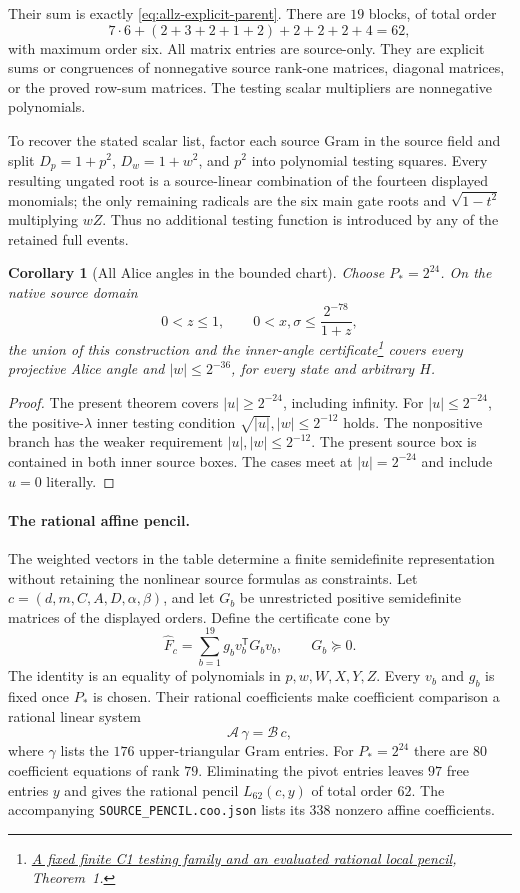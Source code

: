 \documentclass[11pt]{article}
\newtheorem{corollary}{Corollary}
\begin{document}
Their sum is exactly \eqref{eq:allz-explicit-parent}. There are
$19$ blocks, of total order
\[
 7\cdot6+(2+3+2+1+2)+2+2+2+4=62,
\]
with maximum order six. All matrix entries are source-only. They
are explicit sums or congruences of nonnegative source rank-one
matrices, diagonal matrices, or the proved row-sum matrices.
The testing scalar multipliers are nonnegative polynomials.

To recover the stated scalar list, factor each source Gram in the
source field and split $D_p=1+p^2$, $D_w=1+w^2$, and $p^2$ into
polynomial testing squares. Every resulting ungated root is a
source-linear combination of the fourteen displayed monomials;
the only remaining radicals are the six main gate roots and
$\sqrt{1-t^2}$ multiplying $wZ$. Thus no additional testing function
is introduced by any of the retained full events.



\begin{corollary}[All Alice angles in the bounded chart]\label{cor:alice}
Choose $P_*=2^{24}$. On the native source domain
\[
 0<z\le1,\qquad 0<x,\sigma\le\frac{2^{-78}}{1+z},
\]
the union of this construction and the inner-angle certificate\footnote{\href{https://github.com/anubhav70747/q222-finite-sdp/tree/main/extracted-lifts/local-order669}{A fixed finite C1 testing family and an evaluated rational local pencil}, Theorem~1.} covers every projective Alice angle and
$|w|\le2^{-36}$, for every state and arbitrary $H$.
\end{corollary}
\begin{proof}
The present theorem covers $|u|\ge2^{-24}$, including infinity.
For $|u|\le2^{-24}$, the positive-$\lambda$ inner testing
condition $\sqrt{|u|},|w|\le2^{-12}$ holds. The nonpositive branch
has the weaker requirement $|u|,|w|\le2^{-12}$. The present source
box is contained in both inner source boxes. The cases meet at
$|u|=2^{-24}$ and include $u=0$ literally.
\end{proof}


\paragraph{The rational affine pencil.}
The weighted vectors in the table determine a finite semidefinite
representation without retaining the nonlinear source formulas as constraints.
Let $c=(d,m,C,A,D,\alpha,\beta)$, and let $G_b$ be unrestricted positive
semidefinite matrices of the displayed orders. Define the certificate cone by
\[
 \widehat F_c=\sum_{b=1}^{19} g_b v_b^{\mathsf T}G_bv_b,
 \qquad G_b\succeq0.
\]
The identity is an equality of polynomials in $p,w,W,X,Y,Z$.
Every $v_b$ and $g_b$ is fixed once $P_*$ is chosen. Their rational
coefficients make coefficient comparison a rational linear system
\[
 \mathcal A\,\gamma=\mathcal B\,c,
\]
where $\gamma$ lists the $176$ upper-triangular Gram entries.
For $P_*=2^{24}$ there are $80$ coefficient equations of rank $79$.
Eliminating the pivot entries leaves $97$ free entries $y$ and gives
the rational pencil $L_{62}(c,y)$ of total order $62$.
The accompanying \texttt{SOURCE\_PENCIL.coo.json} lists its $338$
nonzero affine coefficients.
\end{document}

